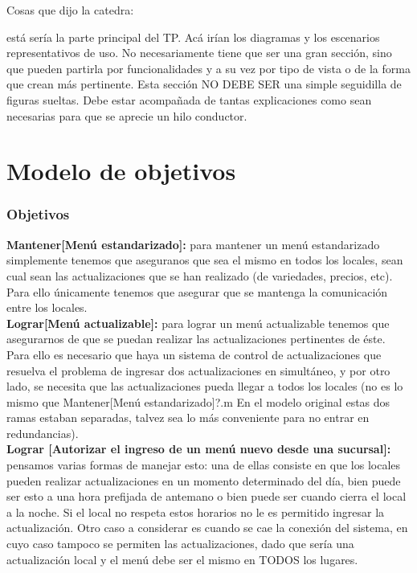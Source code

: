 \documentclass[a4paper,10pt]{article}
\begin{document}
Cosas que dijo la catedra:

está sería la parte principal del TP. Acá irían los
diagramas y los escenarios representativos de uso. No necesariamente
tiene que ser una gran sección, sino que pueden partirla por
funcionalidades y a su vez por tipo de vista o de la forma que crean
más pertinente. Esta sección NO DEBE SER una simple seguidilla de
figuras sueltas. Debe estar acompañada de tantas explicaciones como
sean necesarias para que se aprecie un hilo conductor.

\section*{Modelo de objetivos}
\subsubsection*{Objetivos}
\noindent
\textbf{Mantener[Menú estandarizado]:} para mantener un menú estandarizado simplemente tenemos que aseguranos que sea el mismo en todos los locales, sean cual sean las actualizaciones que se han realizado (de variedades, precios, etc). Para ello únicamente tenemos que asegurar que se mantenga la comunicación entre los locales. \\
\textbf{Lograr[Menú actualizable]:} para lograr un menú actualizable tenemos que asegurarnos de que se puedan realizar las actualizaciones pertinentes de éste. Para ello es necesario que haya un sistema de control de actualizaciones que resuelva el problema de ingresar dos actualizaciones en simultáneo, y por otro lado, se necesita que las actualizaciones pueda llegar a todos los locales (no es lo mismo que Mantener[Menú estandarizado]?.m En el modelo original estas dos ramas estaban separadas, talvez sea lo más conveniente para no entrar en redundancias). \\
\textbf{Lograr [Autorizar el ingreso de un menú nuevo desde una sucursal]:} pensamos varias formas de manejar esto: una de ellas consiste en que los locales pueden realizar actualizaciones en un momento determinado del día, bien puede ser esto a una hora prefijada de antemano o bien puede ser cuando cierra el local a la noche. Si el local no respeta estos horarios no le es permitido ingresar la actualización. Otro caso a considerar es cuando se cae la conexión del sistema, en cuyo caso tampoco se permiten las actualizaciones, dado que sería una actualización local y el menú debe ser el mismo en TODOS los lugares. \\
\end{document}
